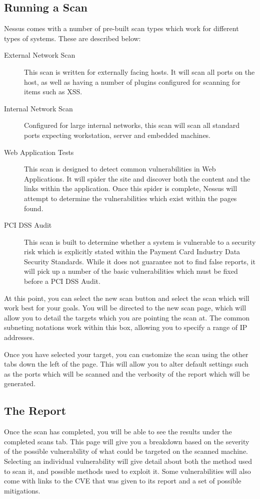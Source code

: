 		\subsection{Running a Scan}
			Nessus comes with a number of pre-built scan types which work for different types of systems.
			These are described below:
			\begin{description}
				\item[External Network Scan] This scan is written for externally facing hosts.
					It will scan all ports on the host, as well as having a number of plugins configured for scanning for items such as XSS.
				\item[Internal Network Scan]
					Configured for large internal networks, this scan will scan all standard ports expecting workstation, server and embedded machines.
				\item[Web Application Tests]
					This scan is designed to detect common vulnerabilities in Web Applications.
					It will spider the site and discover both the content and the links within the application.
					Once this spider is complete, Nessus will attempt to determine the vulnerabilities which exist within the pages found.
				\item[PCI DSS Audit]
					This scan is built to determine whether a system is vulnerable to a security risk which is explicitly stated within the Payment Card Industry Data Security Standards.
					While it does not guarantee not to find false reports, it will pick up a number of the basic vulnerabilities which must be fixed before a PCI DSS Audit.
			\end{description}
			At this point, you can select the new scan button and select the scan which will work best for your goals.
			You will be directed to the new scan page, which will allow you to detail the targets which you are pointing the scan at.
			The common subneting notations work within this box, allowing you to specify a range of IP addresses.

			Once you have selected your target, you can customize the scan using the other tabs down the left of the page.
			This will allow you to alter default settings such as the ports which will be scanned and the verbosity of the report which will be generated.
		\subsection{The Report}
			Once the scan has completed, you will be able to see the results under the completed scans tab.
			This page will give you a breakdown based on the severity of the possible vulnerability of what could be targeted on the scanned machine.
			Selecting an individual vulnerability will give detail about both the method used to scan it, and possible methods used to exploit it.
			Some vulnerabilities will also come with links to the CVE that was given to its report and a set of possible mitigations.

